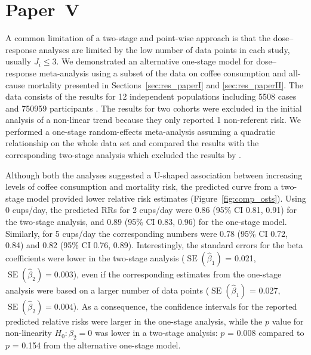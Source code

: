 \documentclass[11pt,a4paper,twoside,openany]{book}\usepackage{knitr}
\DeclareMathOperator{\SE}{SE}
\begin{document}
{{\section{Paper~V}



A common limitation of a two-stage and point-wise approach is that the dose--response analyses are limited by the low number of data points in each study, usually $J_i \le 3$. We demonstrated an alternative one-stage model for dose--response meta-analysis using a subset of the data on coffee consumption and all-cause mortality presented in Sections~\ref{sec:res_paperI} and \ref{sec:res_paperII}. The data consists of the results for 12 independent populations including 5508 cases and 750959 participants \citep{crippa2016red}. The results for two cohorts \citep{nilsson2012traditional} were excluded in the initial analysis of a non-linear trend because they only reported 1 non-referent risk. We performed a one-stage random-effects meta-analysis assuming a quadratic relationship on the whole data set and compared the results with the corresponding two-stage analysis which excluded the results by \cite{nilsson2012traditional}. 

\noindent Although both the analyses suggested a U-shaped association between increasing levels of coffee consumption and mortality risk, the predicted curve from a two-stage model provided lower relative risk estimates (Figure~\ref{fig:comp_osts}). Using 0 cups/day, the predicted RRs for 2 cups/day were 0.86 (95\% CI 0.81, 0.91) for the two-stage analysis, and 0.89 (95\% CI 0.83, 0.96) for the one-stage model. Similarly, for 5 cups/day the corresponding numbers were 0.78 (95\% CI 0.72, 0.84) and 0.82 (95\% CI 0.76, 0.89). Interestingly, the standard errors for the beta coefficients were lower in the two-stage analysis ($\SE \left(\hat \beta_1 \right)$ = 0.021, $\SE \left(\hat \beta_2 \right) = 0.003$), even if the corresponding estimates from the one-stage analysis were based on a larger number of data points ($\SE \left(\hat \beta_1 \right)$ = 0.027, $\SE \left(\hat \beta_2 \right) = 0.004$). As a consequence, the confidence intervals for the reported predicted relative risks were larger in the one-stage analysis, while the $p$ value for non-linearity $H_0: \beta_2 = 0$ was lower in a two-stage analysis: $p$ = 0.008 compared to $p$ = 0.154 from the alternative one-stage model.

\begin{knitrout}\footnotesize
{}\color{fgcolor}\begin{figure}[ht!]


\end{figure}
\end{knitrout}}}
\end{document}

